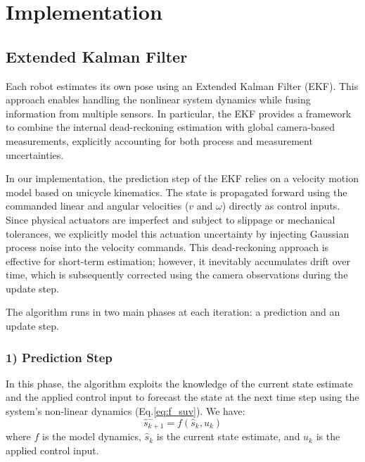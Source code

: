 \documentclass[times, twoside]{zHenriquesLab-StyleBioRxiv}
\begin{document}
\section*{Implementation}


\subsection{Extended Kalman Filter}

Each robot estimates its own pose using an Extended Kalman Filter (EKF). This approach enables handling the nonlinear system dynamics while fusing information from multiple sensors. In particular, the EKF provides a framework to combine the internal dead-reckoning estimation with global camera-based measurements, explicitly accounting for both process and measurement uncertainties.

In our implementation, the prediction step of the EKF relies on a velocity motion model based on unicycle kinematics. The state is propagated forward using the commanded linear and angular velocities ($v$ and $\omega$) directly as control inputs. Since physical actuators are imperfect and subject to slippage or mechanical tolerances, we explicitly model this actuation uncertainty by injecting Gaussian process noise into the velocity commands. This dead-reckoning approach is effective for short-term estimation; however, it inevitably accumulates drift over time, which is subsequently corrected using the camera observations during the update step. 

The algorithm runs in two main phases at each iteration: a prediction and an update step. 

\subsubsection*{1) Prediction Step}
In this phase, the algorithm exploits the knowledge of the current state estimate and the applied control input to forecast the state at the next time step using the system's non-linear dynamics (Eq.\ref{eq:f_suv}). We have:
\begin{equation}
    \hat{s}_{k+1}^{-} = f(\hat{s}_k, u_k)
    \label{eq:ekf_predict_state}
\end{equation}
where $f$ is the model dynamics, $\hat{s}_k$ is the current state estimate, and $u_k$ is the applied control input. 
\end{document}
